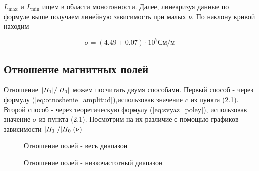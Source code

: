 \documentclass[a4paper]{article}
\begin{document}
\vspace{1cm}
$L_{\max}$ и $L_{\min}$ ищем в области монотонности. Далее, линеаризуя данные по формуле
выше получаем линейную зависимость при малых $\nu$. По наклону кривой находим

\begin{equation}
    \sigma = (4.49 \pm 0.07) \cdot 10^7 См/м
\end{equation}

\newpage

\subsection{Отношение магнитных полей}
Отношение $\abs{H_1}/\abs{H_0}$ можем посчитать двумя способами. Первый способ - через
формулу (\ref{eq:otnoshenie_amplitud}),использовав значение $c$ из пункта (2.1).
Второй способ - через теоретическую формулу (\ref{eq:svyaz_poley}), использовав значение
$\sigma$ из пункта (2.1). Посмотрим на их различие с помощью графиков зависимости
$\abs{H_1}/\abs{H_0} (\nu)$

\begin{figure}[h]
    \caption{Отношение полей - весь диапазон}\label{fig:all_freq_ratio}
    \caption{Отношение полей - низкочастотный диапазон}\label{fig:low_freq_ratio}
    \newpage
\end{figure}
\end{document}
